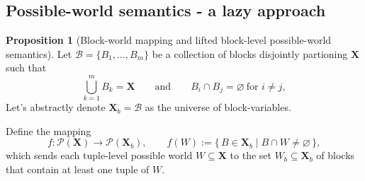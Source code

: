\documentclass[10pt,a4paper]{scrartcl}
\theoremstyle{definition}
\newtheorem{proposition}[theorem]{Proposition}
\theoremstyle{remark}
\begin{document}
\subsection{Possible-world semantics - a lazy approach}
\begin{proposition}[Block-world mapping and lifted block-level possible-world semantics]
Let
  $\mathcal{B} = \{B_1,\dots,B_m\}$ be a collection of blocks disjointly partioning $\mathbf{X}$ such that
\[
\bigcup_{k=1}^m B_k = \mathbf{X}
\qquad\text{and}\qquad
B_i\cap B_j=\varnothing\ \text{for }i\neq j,
\]
Let's abstractly denote $\mathbf{X}_b=\mathcal{B}$ as the universe of block-variables.

Define the mapping
\[
f:\mathcal{P}(\mathbf{X})\longrightarrow \mathcal{P}(\mathbf{X}_b),\qquad
f(W):=\{\,B\in\mathbf{X}_b \mid B\cap W\neq\varnothing\,\},
\]
which sends each tuple-level possible world $W\subseteq\mathbf{X}$ to the
set $W_b\subseteq\mathbf{X}_b$ of blocks that contain at least one tuple of
$W$.


\end{proposition}
\end{document}
